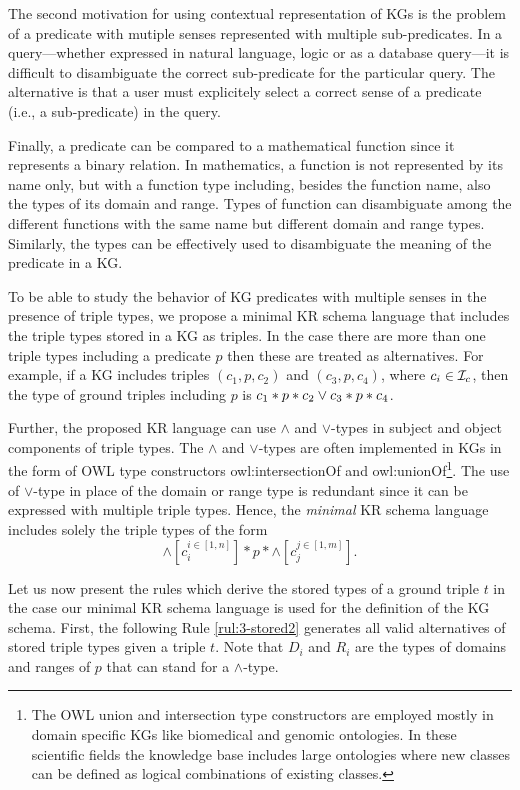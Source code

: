 \documentclass[runningheads]{llncs}
\newcommand{\I}{{\cal I}}
\begin{document}
The second motivation for using contextual representation of KGs is
the problem of a predicate with mutiple senses represented with
multiple sub-predicates. In a query---whether expressed in natural
language, logic or as a database query---it is difficult to
disambiguate the correct sub-predicate for the particular query. The
alternative is that a user must explicitely select a correct sense of
a predicate (i.e., a sub-predicate) in the query.

Finally, a predicate can be compared to a mathematical function since
it represents a binary relation. In mathematics, a function is not
represented by its name only, but with a function type including,
besides the function name, also the types of its domain and
range. Types of function can disambiguate among the different
functions with the same name but different domain and range
types. Similarly, the types can be effectively used to disambiguate
the meaning of the predicate in a KG.

To be able to study the behavior of KG predicates with multiple senses
in the presence of triple types, we propose a minimal KR schema
language that includes the triple types stored in a KG as triples. In
the case there are more than one triple types including a predicate
$p$ then these are treated as alternatives. For example, if a KG
includes triples $(c_1,p,c_2)$ and $(c_3,p,c_4)$, where $c_i\in\I_c$,
then the type of ground triples including $p$ is
$c_1*p*c_2\lor\/c_3*p*c_4$.

Further, the proposed KR language can use $\land$ and $\lor$-types in
subject and object components of triple types. The $\land$ and
$\lor$-types are often implemented in KGs in the form of OWL type
constructors owl:intersectionOf and owl:unionOf\footnote{The OWL union
  and intersection type constructors are employed mostly in domain
  specific KGs like biomedical and genomic ontologies. In these
  scientific fields the knowledge base includes large ontologies where
  new classes can be defined as logical combinations of existing
  classes.}. The use of $\lor$-type in place of the domain or range
type is redundant since it can be expressed with multiple triple
types. Hence, the \emph{minimal} KR schema language includes solely
the triple types of the form
$$\land[c_i^{i\in[1,n]}]*p*\land[c_j^{j\in[1,m]}].$$

Let us now present the rules which derive the stored types of a ground
triple $t$ in the case our minimal KR schema language is used for the
definition of the KG schema. First, the following Rule
\ref{rul:3-stored2} generates all valid alternatives of stored triple
types given a triple $t$. Note that $D_i$ and $R_i$ are the types of
domains and ranges of $p$ that can stand for a $\land$-type.
\end{document}
